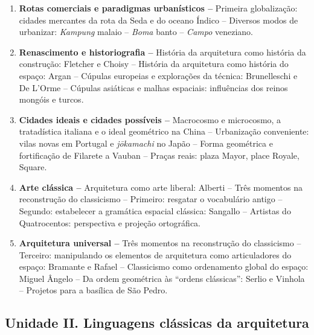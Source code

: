 \documentclass[
  11pt,
  brazil,
  a4paper,
]{article}
\begin{document}
\begin{enumerate}
\def\labelenumi{\arabic{enumi}.}
\item
  \textbf{Rotas comerciais e paradigmas urbanísticos --} Primeira
  globalização: cidades mercantes da rota da Seda e do oceano Índico --
  Diversos modos de urbanizar: \emph{Kampung} malaio -- \emph{Boma}
  banto -- \emph{Campo} veneziano.
\item
  \textbf{Renascimento e historiografia --} História da arquitetura como
  história da construção: Fletcher e Choisy -- História da arquitetura
  como história do espaço: Argan -- Cúpulas europeias e explorações da
  técnica: Brunelleschi e De L'Orme -- Cúpulas asiáticas e malhas
  espaciais: influências dos reinos mongóis e turcos.
\item
  \textbf{Cidades ideais e cidades possíveis --} Macrocosmo e
  microcosmo, a tratadística italiana e o ideal geométrico na China --
  Urbanização conveniente: vilas novas em Portugal e \emph{jōkamachi} no
  Japão -- Forma geométrica e fortificação de Filarete a Vauban --
  Praças reais: plaza Mayor, place Royale, Square.
\item
  \textbf{Arte clássica --} Arquitetura como arte liberal: Alberti --
  Três momentos na reconstrução do classicismo -- Primeiro: resgatar o
  vocabulário antigo -- Segundo: estabelecer a gramática espacial
  clássica: Sangallo -- Artistas do Quatrocentos: perspectiva e projeção
  ortográfica.
\item
  \textbf{Arquitetura universal --} Três momentos na reconstrução do
  classicismo -- Terceiro: manipulando os elementos de arquitetura como
  articuladores do espaço: Bramante e Rafael -- Classicismo como
  ordenamento global do espaço: Miguel Ângelo -- Da ordem geométrica às
  ``ordens clássicas'': Serlio e Vinhola -- Projetos para a basílica de
  São Pedro.
\end{enumerate}

\hypertarget{unidade-ii.-linguagens-cluxe1ssicas-da-arquitetura}{%
\subsection{Unidade II. Linguagens clássicas da
arquitetura}\label{unidade-ii.-linguagens-cluxe1ssicas-da-arquitetura}}
\end{document}

